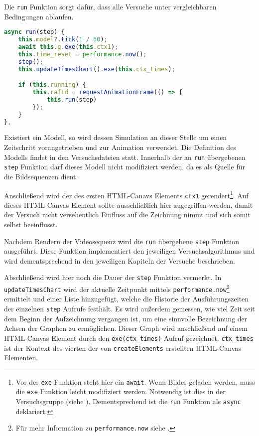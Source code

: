 Die \lstinline{run} Funktion sorgt dafür, dass alle Versuche unter vergleichbaren Bedingungen ablaufen.

\begin{lstlisting}[language=JavaScript, caption={Definition der \lstinline{simulation.run} Funktion.}, label={lst:sim_run}]
async run(step) {
    this.model?.tick(1 / 60);
    await this.g.exe(this.ctx1);
    this.time_reset = performance.now();
    step();
    this.updateTimesChart().exe(this.ctx_times);

    if (this.running) {
        this.rafId = requestAnimationFrame(() => {
            this.run(step)
        });
    }
},
\end{lstlisting}

Existiert ein  Modell, so wird dessen Simulation an dieser Stelle um einen Zeitschritt vorangetrieben und zur Animation verwendet.
Die Definition des  Modells findet in den Versuchsdateien statt.
Innerhalb der an \lstinline{run} übergebenen \lstinline{step} Funktion darf dieses Modell nicht modifiziert werden, da es als Quelle für die Bildsequenzen dient.

Anschlie{\ss}end wird der  des ersten  HTML-Canavs Elements \lstinline{ctx1} gerendert\footnote{Vor der \lstinline{exe} Funktion steht hier ein \lstinline{await}. Wenn Bilder geladen werden, muss die \lstinline{exe} Funktion leicht modifiziert werden. Notwendig ist dies in der Versuchsgruppe  (siehe ).
Dementsprechend ist die \lstinline{run} Funktion als \lstinline{async} deklariert.}.
Auf dieses HTML-Canvas Element sollte ausschlie{\ss}lich hier zugegriffen werden, damit der Versuch nicht versehentlich Einfluss auf die Zeichnung nimmt und sich somit selbst beeinflusst.

Nachdem Rendern der Videosequenz wird die \lstinline{run} übergebene \lstinline{step} Funktion ausgeführt.
Diese Funktion implementiert den jeweiligen Versuchsalgorithmus und wird dementsprechend in den jeweiligen Kapiteln der Versuche beschrieben.

Abschlie{\ss}end wird hier noch die Dauer der \lstinline{step} Funktion vermerkt.
In \lstinline{updateTimesChart} wird der aktuelle Zeitpunkt mittels \lstinline{performance.now}\footnote{Für mehr Information zu \lstinline{performance.now} siehe .} ermittelt und einer Liste hinzugefügt, welche die Historie der Ausführungszeiten der einzelnen \lstinline{step} Aufrufe festhält.
Es wird au{\ss}erdem gemessen, wie viel Zeit seit dem Beginn der Aufzeichnung vergangen ist, um eine sinnvolle Bezeichnung der Achsen der Graphen zu ermöglichen.
Dieser Graph wird anschlie{\ss}end auf einem HTML-Canvas Element durch den \lstinline{exe(ctx_times)} Aufruf gezeichnet.
\lstinline{ctx_times} ist der Kontext des vierten der von \lstinline{createElements} erstellten HTML-Canvas Elementen.

